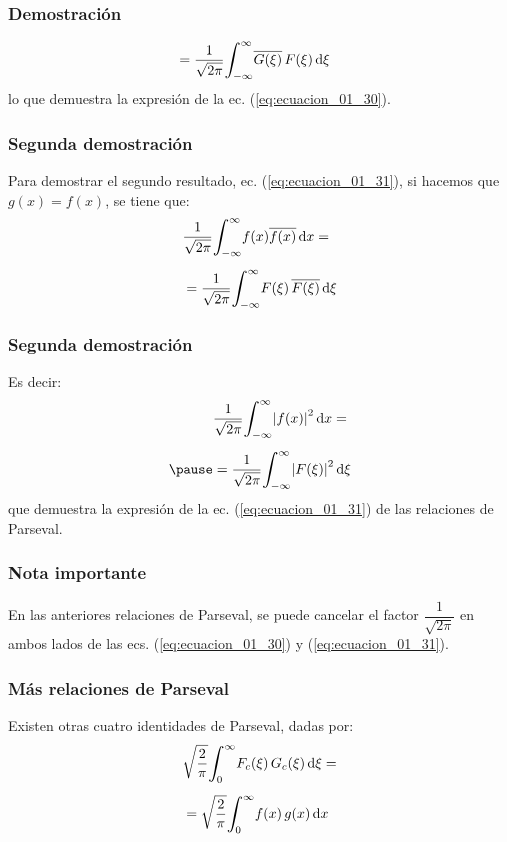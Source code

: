 \begin{frame}
\frametitle{Demostración}
\begin{eqnarray*}
\begin{aligned}
&= \dfrac{1}{\sqrt{2 \pi}} \scaleint{6ex}_{\bs -\infty}^{\infty} \overline{G (\xi)} \, F (\xi) \dd{\xi}
\end{aligned}
\end{eqnarray*}
\pause
lo que demuestra la expresión de la ec. (\ref{eq:ecuacion_01_30}).
\end{frame}
\begin{frame}
\frametitle{Segunda demostración}  
Para demostrar el segundo resultado, ec. (\ref{eq:ecuacion_01_31}), si hacemos que $g (x) = f (x)$, se tiene que:
\pause
\begin{eqnarray*}
\begin{aligned}
&\dfrac{1}{\sqrt{2 \pi}} \scaleint{6ex}_{\bs -\infty}^{\infty} f (x) \overline{f (x)} \dd{x} = \\[0.5em] 
&=\dfrac{1}{\sqrt{2 \pi}} \scaleint{6ex}_{\bs -\infty}^{\infty} F (\xi) \, \overline{F (\xi)} \dd{\xi}
\end{aligned}
\end{eqnarray*}
\end{frame}
\begin{frame}
\frametitle{Segunda demostración}
Es decir:
\pause
\begin{eqnarray*}
\begin{aligned}
&\dfrac{1}{\sqrt{2 \pi}} \scaleint{6ex}_{\bs -\infty}^{\infty} \abs{f (x)}^2 \dd{x} = \\[0.5em] \pause
&= \dfrac{1}{\sqrt{2 \pi}} \scaleint{6ex}_{\bs -\infty}^{\infty} \abs{F (\xi)}^{2} \dd{\xi}
\end{aligned}
\end{eqnarray*}
\pause
que demuestra la expresión de la ec. (\ref{eq:ecuacion_01_31}) de las relaciones de Parseval.
\end{frame}
\begin{frame}
\frametitle{Nota importante}
En las anteriores relaciones de Parseval, se puede cancelar el factor $\dfrac{1}{\sqrt{2 \pi}}$ en ambos lados de las ecs. (\ref{eq:ecuacion_01_30}) y (\ref{eq:ecuacion_01_31}).
\end{frame}
\begin{frame}
\frametitle{Más relaciones de Parseval}
Existen otras cuatro identidades de Parseval, dadas por:
\pause
\begin{eqnarray}
\begin{aligned}[b]
&\sqrt{\dfrac{2}{\pi}} \scaleint{6ex}_{\bs 0}^{\infty} F_{c} (\xi) \, G_{c} (\xi) \dd{\xi} = \\[0.5em]
&= \sqrt{\dfrac{2}{\pi}} \scaleint{6ex}_{\bs 0}^{\infty} f (x) \, g (x) \dd{x}
\end{aligned}
\label{eq:ecuacion_01_32}
\end{eqnarray}
\end{frame}
